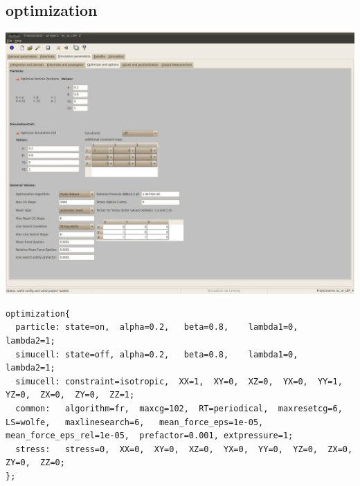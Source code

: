 \subsection{optimization}
\label{sub:optimization}
\includegraphics[width=15cm]{visuals/GUI_Parameter_Optimizer.jpg}

\begin{lstlisting}
optimization{
  particle: state=on,  alpha=0.2,   beta=0.8,    lambda1=0,   lambda2=1;
  simucell: state=off, alpha=0.2,   beta=0.8,    lambda1=0,   lambda2=1;
  simucell: constraint=isotropic,  XX=1,  XY=0,  XZ=0,  YX=0,  YY=1,  YZ=0,  ZX=0,  ZY=0,  ZZ=1;
  common:   algorithm=fr,  maxcg=102,  RT=periodical,  maxresetcg=6,  LS=wolfe,   maxlinesearch=6,   mean_force_eps=1e-05,  mean_force_eps_rel=1e-05,  prefactor=0.001, extpressure=1;
  stress:   stress=0,  XX=0,  XY=0,  XZ=0,  YX=0,  YY=0,  YZ=0,  ZX=0,  ZY=0,  ZZ=0;
};
\end{lstlisting}

